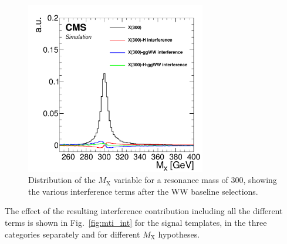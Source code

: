 \begin{figure}[htb]
\centering
\includegraphics[width=0.7\textwidth]{images/13TeV/Interference/int300.pdf}
\caption{
    Distribution of the $M_\mathrm{X}$ variable for a resonance mass of 300\GeV, showing the various interference terms after the WW baseline selections.}
    \label{fig:int300}
\end{figure}

The effect of the resulting interference contribution including all the different terms is shown in Fig.~\ref{fig:mti_int} for the \mti signal templates, in the three categories separately and for different $M_\mathrm{X}$ hypotheses.

